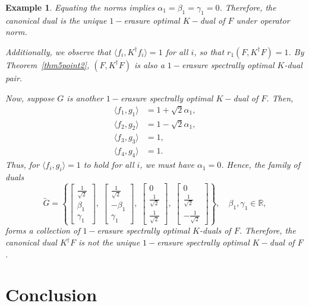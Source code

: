 \documentclass[final,1p,times]{elsarticle}
\newtheorem{example}[thm]{Example}
\begin{document}
\begin{example}
Equating the norms implies $\alpha_1 = \beta_1 = \gamma_1 = 0$. Therefore, the canonical dual is the unique $1-$erasure optimal $K-$dual of $F$ under operator norm.

Additionally, we observe that $\langle f_i, K^\dag f_i \rangle = 1$ for all $i$, so that $r_1(F, K^\dag F) = 1$. By Theorem~\ref{thm5point2}, $(F, K^\dag F)$ is also a $1-$erasure spectrally optimal $K$-dual pair.

Now, suppose $G$ is another $1-$erasure spectrally optimal $K-$dual of $F$. Then,
\begin{align*}
\langle f_1, g_1 \rangle &= 1 + \sqrt{2}\alpha_1, \\
\langle f_2, g_2 \rangle &= 1 - \sqrt{2}\alpha_1, \\
\langle f_3, g_3 \rangle &= 1, \\
\langle f_4, g_4 \rangle &= 1.
\end{align*}
Thus, for $\langle f_i, g_i \rangle = 1$ to hold for all $i$, we must have $\alpha_1 = 0$. Hence, the family of duals
\[
\tilde{G} = \left\{
\begin{bmatrix} \frac{1}{\sqrt{2}} \\ \beta_1 \\ \gamma_1 \end{bmatrix},\;
\begin{bmatrix} \frac{1}{\sqrt{2}} \\ -\beta_1 \\ \gamma_1 \end{bmatrix},\;
\begin{bmatrix} 0 \\ \frac{1}{\sqrt{2}} \\ \frac{1}{\sqrt{2}} \end{bmatrix},\;
\begin{bmatrix} 0 \\ \frac{1}{\sqrt{2}} \\ -\frac{1}{\sqrt{2}} \end{bmatrix}
\right\}, \quad \beta_1, \gamma_1 \in \mathbb{R},
\]
forms a collection of $1-$erasure spectrally optimal $K$-duals of $F$. Therefore, the canonical dual $K^\dag F$ is not the unique $1-$erasure spectrally optimal $K-$dual of $F$.
\end{example}




\section*{Conclusion}
\end{document}
